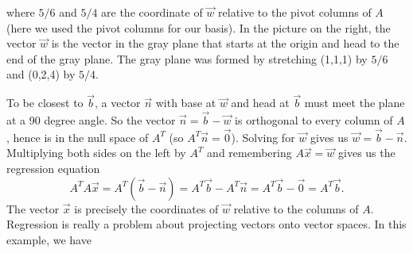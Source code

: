 \begin{example}
$$$$
where $5/6$ and $5/4$ are the coordinate of $\vec w$ relative to the pivot columns of $A$ (here we used the pivot columns for our basis). In the picture on the right, the vector $\vec w$ is the vector in the gray plane that starts at the origin and head to the end of the gray plane.  The gray plane was formed by stretching (1,1,1) by $5/6$ and (0,2,4) by $5/4$.  

To be closest to $\vec b$, a vector $\vec n$ with base at $\vec w$ and head at $\vec b$ must meet the plane at a 90 degree angle.  So the vector $\vec n = \vec b-\vec w$ is orthogonal to every column of $A$, hence is in the null space of $A^T$ (so $A^T\vec n=\vec 0$). Solving for $\vec w$ gives us $\vec w = \vec b-\vec n$.  Multiplying both sides on the left by $A^T$ and remembering $A\vec x = \vec w$ gives us the regression equation
$$A^TA\vec x=A^T(\vec b-\vec n) 
= A^T\vec b - A^T\vec n 
= A^T\vec b - \vec 0 =
A^T\vec b.$$
The vector $\vec x$ is precisely the coordinates of $\vec w$ relative to the columns of $A$. Regression is really a problem about projecting vectors onto vector spaces.  In this example, we have 

\end{example}
